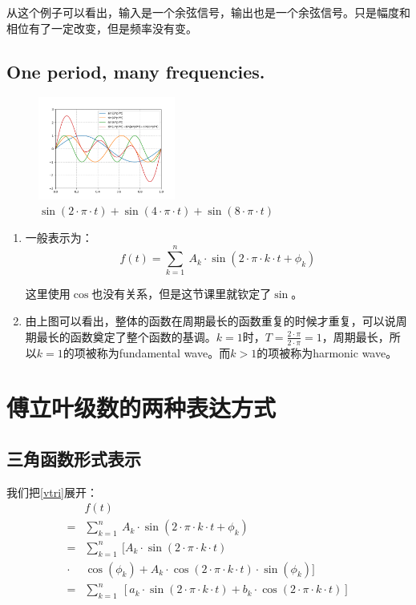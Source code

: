 从这个例子可以看出，输入是一个余弦信号，输出也是一个余弦信号。只是幅度和相位有了一定改变，但是频率没有变。
\subsection{One period, many frequencies.}
\begin{figure}[H]
	\centering
	\includegraphics[width=0.4\textwidth]{assets/Figure_1.png}
	\caption{$\sin(2\cdot\pi\cdot t)+\sin(4\cdot\pi\cdot t)+\sin(8\cdot\pi\cdot t)$}
\end{figure}
\begin{enumerate}
	\item 一般表示为：
	      \begin{equation}\label{vtri}
		      f(t)=\sum\limits_{k=1}^n\ A_k\cdot \sin(2\cdot \pi\cdot k\cdot t+\phi_k)
	      \end{equation}

	      这里使用$\cos$也没有关系，但是这节课里就钦定了$\sin$。
	\item 由上图可以看出，整体的函数在周期最长的函数重复的时候才重复，可以说周期最长的函数奠定了整个函数的基调。$k=1​$时，$T=\frac{2\cdot \pi}{2\cdot \pi}=1​$，周期最长，所以$k=1​$的项被称为fundamental wave。而$k>1​$的项被称为harmonic wave。
\end{enumerate}

\section{傅立叶级数的两种表达方式}
\subsection{三角函数形式表示}
我们把\ref{vtri}展开：
\begin{align*}
	      & f(t)                                                                                                   \\
	=     & \sum\limits_{k=1}^n\ A_k\cdot \sin(2\cdot\pi\cdot k\cdot t+\phi_k)                                     \\
	=     & \sum\limits_{k=1}^n\ [A_k\cdot \sin(2\cdot\pi\cdot k\cdot t)                                           \\
	\cdot & \cos(\phi_k)+A_k\cdot \cos(2\cdot \pi\cdot k\cdot t)\cdot \sin(\phi_k)]                                \\
	=     & \sum\limits_{k=1}^n\ [a_k\cdot \sin(2\cdot\pi\cdot k\cdot t) +b_k\cdot \cos(2\cdot \pi\cdot k\cdot t)]
\end{align*}

